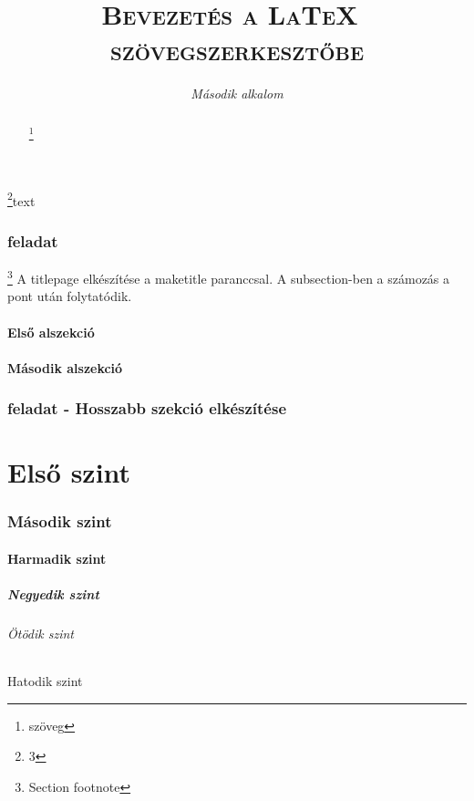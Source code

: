 \documentclass{article}
\begin{document}
	\begin{titlepage}
		\title{\textsc{\huge{Bevezetés a \LaTeX\ \\ szövegszerkesztőbe}}}
		\author{\textit{\Large{Második alkalom}}}
		\maketitle
	\end{titlepage}

\begin{abstract}
	\hulipsum[1]
	\footnote{szöveg}
\end{abstract}
\renewcommand{\thefootnote}{\fnsymbol{footnote}}
\footnote{3}{text}

\clearpage
\setcounter{tocdepth}{5}
\tableofcontents
\clearpage
{}
\section{feladat}\footnote{Section footnote}
A titlepage elkészítése a maketitle paranccsal. A subsection-ben a számozás a pont után folytatódik.
\subsection{Első alszekció}
\hulipsum[2]
\clearpage
\subsection{Második alszekció}
\hulipsum[3]
\section{feladat - Hosszabb szekció elkészítése}
\part{Első szint}
\section{Második szint}
\subsection{Harmadik szint}
\subsubsection{Negyedik szint}
\paragraph{Ötödik szint}
\subparagraph{Hatodik szint}
\end{document}
